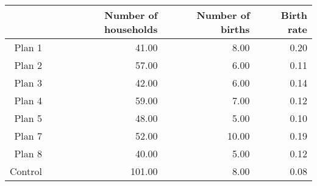 \begin{table}[ht]
\centering
\begin{tabular}{rrrr}
  \hline
 & Number of households & Number of births & Birth rate \\ 
  \hline
Plan 1 & 41.00 & 8.00 & 0.20 \\ 
  Plan 2 & 57.00 & 6.00 & 0.11 \\ 
  Plan 3 & 42.00 & 6.00 & 0.14 \\ 
  Plan 4 & 59.00 & 7.00 & 0.12 \\ 
  Plan 5 & 48.00 & 5.00 & 0.10 \\ 
  Plan 7 & 52.00 & 10.00 & 0.19 \\ 
  Plan 8 & 40.00 & 5.00 & 0.12 \\ 
  Control & 101.00 & 8.00 & 0.08 \\ 
   \hline
\end{tabular}
\end{table}
